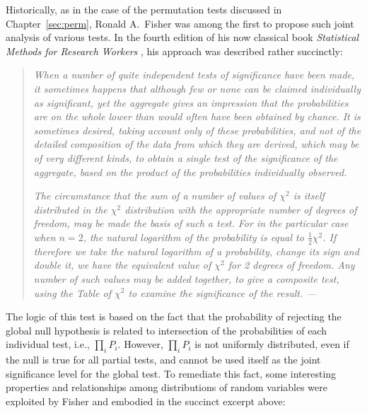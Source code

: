 Historically, as in the case of the permutation tests discussed in Chapter~\ref{sec:perm}, Ronald A.\ Fisher was among the first to propose such joint analysis of various tests. In the fourth edition of his now classical book \textit{Statistical Methods for Research Workers} \citep{Fisher1932}, his approach was described rather succinctly:

\begin{quote}
\emph{When a number of quite independent tests of significance have been made, it sometimes happens that although few or none can be claimed individually as significant, yet the aggregate gives an impression that the probabilities are on the whole lower than would often have been obtained by chance. It is sometimes desired, taking account only of these probabilities, and not of the detailed composition of the data from which they are derived, which may be of very different kinds, to obtain a single test of the significance of the aggregate, based on the product of the probabilities individually observed.}

\emph{The circumstance that the sum of a number of values of $\chi^{2}$ is itself distributed in the $\chi^{2}$ distribution with the appropriate number of degrees of freedom, may be made the basis of such a test. For in the particular case when $n=2$, the natural logarithm of the probability is equal to $\frac{1}{2}\chi^{2}$. If therefore we take the natural logarithm of a probability, change its sign and double it, we have the equivalent value of $\chi^{2}$ for 2 degrees of freedom. Any number of such values may be added together, to give a composite test, using the Table of $\chi^{2}$ to examine the significance of the result. \hfill --- \citet{Fisher1932}}
\end{quote}

The logic of this test is based on the fact that the probability of rejecting the global null hypothesis is related to intersection of the probabilities of each individual test, i.e., $\prod_{i} P_{i}$. However, $\prod_{i} P_{i}$ is not uniformly distributed, even if the null is true for all partial tests, and cannot be used itself as the joint significance level for the global test. To remediate this fact, some interesting properties and relationships among distributions of random variables were exploited by Fisher and embodied in the succinct excerpt above:

